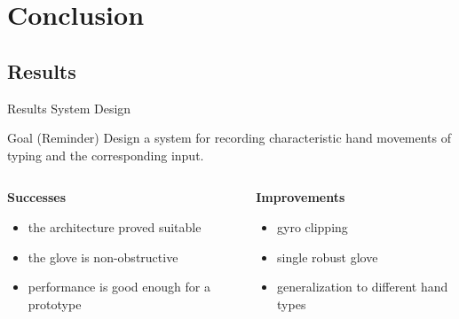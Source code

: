 \section{Conclusion}
\subsection{Results}

\begin{frame}{Results System Design}
    \begin{block}{Goal (Reminder)}
        Design a system for recording characteristic hand movements of typing
        and the corresponding input.
    \end{block}
    \pause
    \vfill\null
    \begin{columns}[T]
        \begin{column}{0.5\textwidth}
            \textbf{Successes}
            \begin{itemize}
                \item the architecture proved suitable
                \item the glove is non-obstructive
                \item performance is good enough for a prototype
            \end{itemize}
        \end{column}
        \begin{column}{0.5\textwidth}
            \textbf{Improvements}
            \begin{itemize}
                \item gyro clipping
                \item single robust glove
                \item generalization to different hand types
            \end{itemize}
        \end{column}
    \end{columns}
\end{frame}

